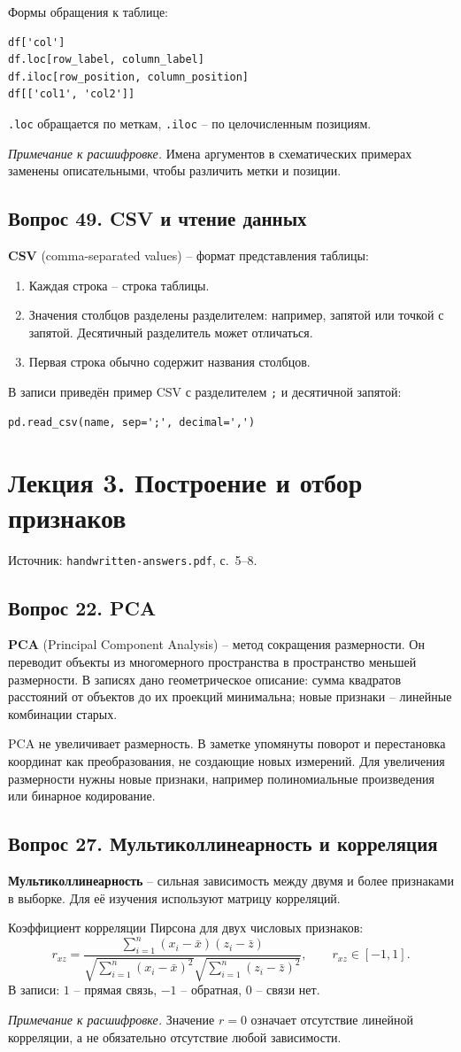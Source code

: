 \documentclass[11pt,a4paper]{article}
\newcommand{\source}[1]{{\small\color{muted}Источник: \texttt{handwritten-answers.pdf}, с.~#1.}\par}
\newcommand{\ednote}[1]{\par{\small\color{muted}\textit{Примечание к расшифровке.} #1}\par}
\newcommand{\question}[2]{\subsection{Вопрос #1. #2}}
\newcommand{\code}[1]{\texttt{#1}}
\begin{document}
Формы обращения к таблице:
\begin{verbatim}
df['col']
df.loc[row_label, column_label]
df.iloc[row_position, column_position]
df[['col1', 'col2']]
\end{verbatim}
\code{.loc} обращается по меткам, \code{.iloc} -- по целочисленным позициям.
\ednote{Имена аргументов в схематических примерах заменены описательными,
чтобы различить метки и позиции.}

\question{49}{CSV и чтение данных}
\textbf{CSV} (comma-separated values) -- формат представления таблицы:
\begin{enumerate}
\item Каждая строка -- строка таблицы.
\item Значения столбцов разделены разделителем: например, запятой или
точкой с запятой. Десятичный разделитель может отличаться.
\item Первая строка обычно содержит названия столбцов.
\end{enumerate}
В записи приведён пример CSV с разделителем \code{;} и десятичной запятой:
\begin{verbatim}
pd.read_csv(name, sep=';', decimal=',')
\end{verbatim}

\clearpage
\section{Лекция 3. Построение и отбор признаков}
\source{5--8}

\question{22}{PCA}
\textbf{PCA} (Principal Component Analysis) -- метод сокращения размерности.
Он переводит объекты из многомерного пространства в пространство меньшей
размерности. В записях дано геометрическое описание: сумма квадратов расстояний
от объектов до их проекций минимальна; новые признаки -- линейные комбинации старых.

PCA не увеличивает размерность. В заметке упомянуты поворот и перестановка
координат как преобразования, не создающие новых измерений. Для увеличения
размерности нужны новые признаки, например полиномиальные произведения
или бинарное кодирование.

\question{27}{Мультиколлинеарность и корреляция}
\textbf{Мультиколлинеарность} -- сильная зависимость между двумя и более
признаками в выборке. Для её изучения используют матрицу корреляций.

Коэффициент корреляции Пирсона для двух числовых признаков:
\[
 r_{xz}=\frac{\sum_{i=1}^{n}(x_i-\bar x)(z_i-\bar z)}
 {\sqrt{\sum_{i=1}^{n}(x_i-\bar x)^2}
  \sqrt{\sum_{i=1}^{n}(z_i-\bar z)^2}},\qquad r_{xz}\in[-1,1].
\]
В записи: $1$ -- прямая связь, $-1$ -- обратная, $0$ -- связи нет.
\ednote{Значение $r=0$ означает отсутствие линейной корреляции,
а не обязательно отсутствие любой зависимости.}
\end{document}
